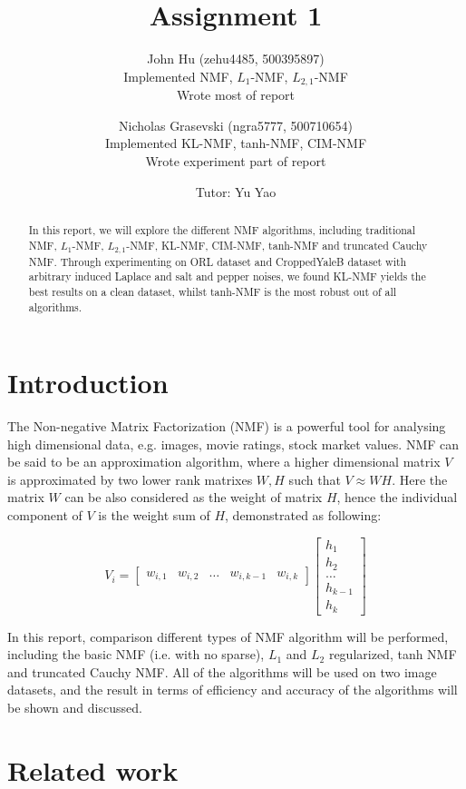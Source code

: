 \documentclass{article} %
\title{Assignment 1}
\author{
  John Hu (zehu4485, 500395897)\\
  Implemented NMF, $L_1$-NMF, $L_{2,1}$-NMF\\
  Wrote most of report
  \and
  Nicholas Grasevski (ngra5777, 500710654)\\
  Implemented KL-NMF, tanh-NMF, CIM-NMF\\
  Wrote experiment part of report
  \and
  Tutor: Yu Yao
}
\begin{document}
\maketitle

\begin{abstract}
In this report, we will explore the different NMF algorithms, including traditional NMF, $L_1$-NMF, $L_{2,1}$-NMF, KL-NMF, CIM-NMF, tanh-NMF and truncated Cauchy NMF. Through experimenting on ORL dataset and CroppedYaleB dataset with arbitrary induced Laplace and salt and pepper noises, we found KL-NMF yields the best results on a clean dataset, whilst tanh-NMF is the most robust out of all algorithms.
\end{abstract}

\section{Introduction}
The Non-negative Matrix Factorization (NMF) is a powerful tool for analysing high dimensional data, e.g. images, movie ratings, stock market values. NMF can be said to be an approximation algorithm, where a higher dimensional matrix $V$ is approximated by two lower rank matrixes $W,H$ such that $V \approx WH$. Here the matrix $W$ can be also considered as the weight of matrix $H$, hence the individual component of $V$ is the weight sum of $H$, demonstrated as following:

\begin{equation}
V_i = \begin{bmatrix}
w_{i,1} & w_{i,2} & \dots & w_{i,k-1} & w_{i,k}
\end{bmatrix} \begin{bmatrix}
h_1\\
h_2\\
\dots\\
h_{k-1}\\
h_k
\end{bmatrix}
\end{equation}

In this report, comparison different types of NMF algorithm will be performed, including the basic NMF (i.e. with no sparse), $L_1$ and $L_2$ regularized, tanh NMF and truncated Cauchy NMF. All of the algorithms will be used on two image datasets, and the result in terms of efficiency and accuracy of the algorithms will be shown and discussed.

\section{Related work}
\end{document}
